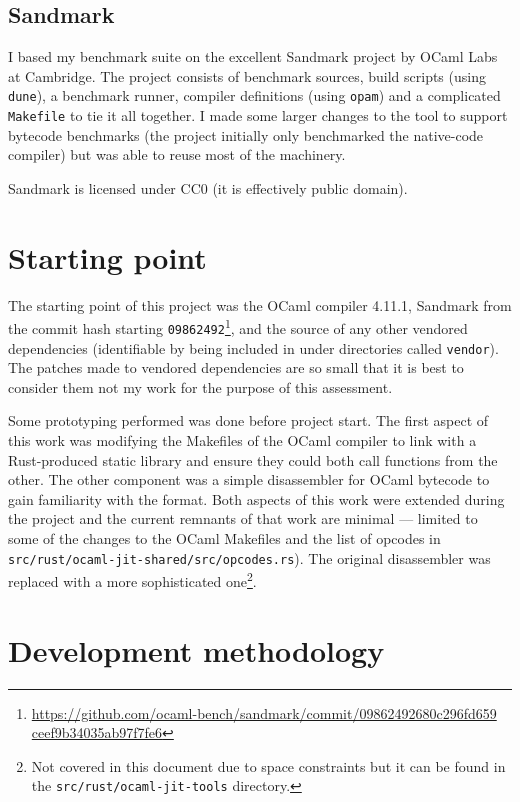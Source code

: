 \subsection{Sandmark}

I based my benchmark suite on the excellent Sandmark project by OCaml Labs at Cambridge. The
project consists of benchmark sources, build scripts (using \texttt{dune}), a benchmark runner,
compiler definitions (using \texttt{opam}) and a complicated \texttt{Makefile} to tie it all
together.  I made some larger changes to the tool to support bytecode benchmarks (the project
initially only benchmarked the native-code compiler) but was able to reuse most of the machinery.

Sandmark is licensed under CC0 (it is effectively public domain).

\section{Starting point}

The starting point of this project was the OCaml compiler 4.11.1, Sandmark from the commit hash
starting
\texttt{09862492}\footnote{\url{https://github.com/ocaml-bench/sandmark/commit/09862492680c296fd659
        ceef9b34035ab97f7fe6}}, and the source of any other vendored dependencies (identifiable by
being
included in under directories called \texttt{vendor}). The patches made to vendored dependencies
are
so small that it is best to consider them not my work for the purpose of this assessment.

Some prototyping performed was done before project start.  The first aspect of this work was
modifying
the Makefiles of the OCaml compiler to link with a
Rust-produced static library and ensure they could both call functions from the other. The other
component was a simple disassembler for OCaml bytecode to gain familiarity with the format. Both
aspects of this work were extended during the project and the current remnants of that work are
minimal --- limited to some of the changes to the OCaml Makefiles and the list of opcodes in
\texttt{src/rust/ocaml-jit-shared/src/opcodes.rs}).  The original disassembler was replaced with a
more sophisticated one\footnote{Not covered in this document due to space constraints but it
    can be found in the \texttt{src/rust/ocaml-jit-tools} directory.}.

\section{Development methodology} \label{dev-methodology}

